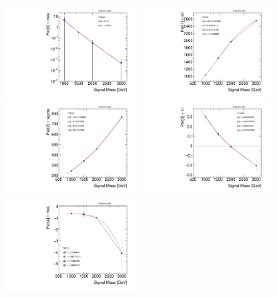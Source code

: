 \begin{figure}[!h]
\begin{center}
\includegraphics*[width=0.45\textwidth]{./figures/boosted/SigInterpolation/ParamFit_GhhC20_Bukin_Graviton_Para0_max}
\includegraphics*[width=0.45\textwidth]{./figures/boosted/SigInterpolation/ParamFit_GhhC20_Bukin_Graviton_Para1_x0}\\
\includegraphics*[width=0.45\textwidth]{./figures/boosted/SigInterpolation/ParamFit_GhhC20_Bukin_Graviton_Para2_sigma}
\includegraphics*[width=0.45\textwidth]{./figures/boosted/SigInterpolation/ParamFit_GhhC20_Bukin_Graviton_Para3_xi}\\
\includegraphics*[width=0.45\textwidth]{./figures/boosted/SigInterpolation/ParamFit_GhhC20_Bukin_Graviton_Para4_rhoL}

\end{center}
\end{figure}
